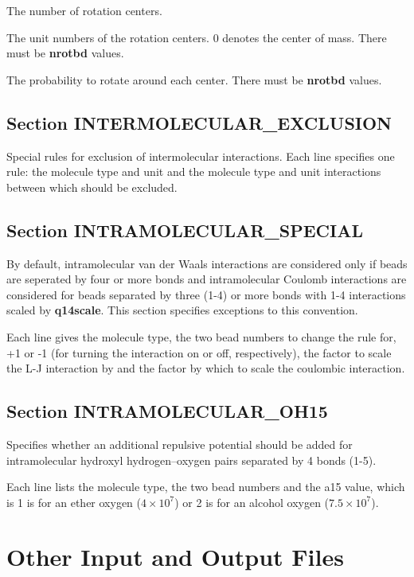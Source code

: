 \documentclass[12pt,letterpaper]{article}
\begin{document}
 The number of rotation centers.

 The unit numbers of the rotation
centers. 0 denotes the center of mass. There must be {\bf
  nrotbd} values.

 The probability to rotate around
each center. There must be {\bf nrotbd} values.

\subsection{Section \textbf{INTERMOLECULAR\_EXCLUSION}}
Special rules for exclusion of intermolecular interactions.
Each line specifies one rule: the molecule type and unit and
the molecule type and unit interactions between which should
be excluded.

\subsection{Section \textbf{INTRAMOLECULAR\_SPECIAL}}
\label{intra_special}
By default, intramolecular van der Waals interactions are
considered only if beads are seperated by four or more bonds
and intramolecular Coulomb interactions are considered for
beads separated by three (1-4) or more bonds with 1-4
interactions scaled by {\bf q14scale}. This section
specifies exceptions to this convention.

Each line gives the molecule type, the two bead numbers to
change the rule for, +1 or -1 (for turning the interaction
on or off, respectively), the factor to scale the L-J
interaction by and the factor by which to scale the
coulombic interaction.

\subsection{Section \textbf{INTRAMOLECULAR\_OH15}}
Specifies whether an additional repulsive potential should
be added for intramolecular hydroxyl hydrogen--oxygen pairs
separated by 4 bonds (1-5).

Each line lists the molecule type, the two bead numbers and
the a15 value, which is 1 is for an ether oxygen ($4\times
10^7$) or 2 is for an alcohol oxygen ($7.5\times 10^7$).

\section{Other Input and Output Files}
\end{document}
